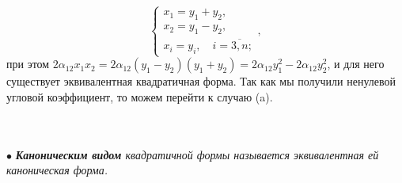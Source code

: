 \begin{Proof}
\begin{enumerate}
\begin{enumerate}
			$$\begin{cases} x_1 = y_1 + y_2, \\ x_2 = y_1 - y_2, \\ x_i = y_i, \quad i = \overline{3,n}; \end{cases},$$ при этом
			$2\alpha_{12} x_1 x_2 = 2\alpha_{12} (y_1 - y_2) (y_1 + y_2) = 2 \alpha_{12} y_1^2 - 2\alpha_{12} y_2^2$, и для него существует эквивалентная квадратичная форма. Так как мы получили ненулевой угловой коэффициент, то можем перейти к случаю (a).
		\end{enumerate}
	\end{enumerate}
	
	
\end{Proof}\\\\
$\bullet$ \textit{\textbf{Каноническим видом} квадратичной формы называется эквивалентная ей каноническая форма.}








